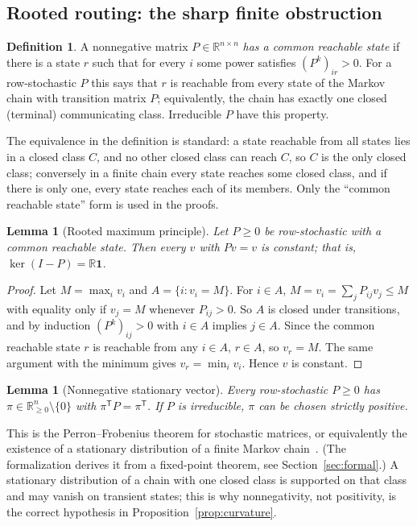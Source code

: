 \documentclass[11pt,reqno]{amsart}
\theoremstyle{plain}
\newtheorem{lemma}[theorem]{Lemma}
\theoremstyle{definition}
\newtheorem{definition}[theorem]{Definition}
\theoremstyle{remark}
\numberwithin{equation}{section}
\newcommand{\R}{\mathbb{R}}
\newcommand{\one}{\mathbf{1}}
\newcommand{\Ker}{\operatorname{ker}}
\newcommand{\T}{\mathsf{T}}
\begin{document}
\subsection{Rooted routing: the sharp finite obstruction}
\begin{definition}\label{def:rooted}
A nonnegative matrix $P\in\R^{n\times n}$ \emph{has a common reachable state} if there is a state $r$ such that for every $i$ some power satisfies $(P^k)_{ir}>0$.  For a row-stochastic $P$ this says that $r$ is reachable from every state of the Markov chain with transition matrix $P$; equivalently, the chain has exactly one closed (terminal) communicating class.  Irreducible $P$ have this property.
\end{definition}

The equivalence in the definition is standard: a state reachable from all states lies in a closed class $C$, and no other closed class can reach $C$, so $C$ is the only closed class; conversely in a finite chain every state reaches some closed class, and if there is only one, every state reaches each of its members.  Only the ``common reachable state'' form is used in the proofs.

\begin{lemma}[Rooted maximum principle]\label{lem:maxprinciple}
Let $P\ge0$ be row-stochastic with a common reachable state.  Then every $v$ with $Pv=v$ is constant; that is, $\Ker(I-P)=\R\one$.
\end{lemma}

\begin{proof}
Let $M=\max_iv_i$ and $A=\{i:v_i=M\}$.  For $i\in A$, $M=v_i=\sum_jP_{ij}v_j\le M$ with equality only if $v_j=M$ whenever $P_{ij}>0$.  So $A$ is closed under transitions, and by induction $(P^k)_{ij}>0$ with $i\in A$ implies $j\in A$.  Since the common reachable state $r$ is reachable from any $i\in A$, $r\in A$, so $v_r=M$.  The same argument with the minimum gives $v_r=\min_iv_i$.  Hence $v$ is constant.
\end{proof}

\begin{lemma}[Nonnegative stationary vector]\label{lem:stationary}
Every row-stochastic $P\ge0$ has $\pi\in\R^n_{\ge0}\setminus\{0\}$ with $\pi^{\T}P=\pi^{\T}$.  If $P$ is irreducible, $\pi$ can be chosen strictly positive.
\end{lemma}

This is the Perron--Frobenius theorem for stochastic matrices, or equivalently the existence of a stationary distribution of a finite Markov chain~\cite{Sen06,KS76,BP94}.  (The formalization derives it from a fixed-point theorem, see Section~\ref{sec:formal}.)  A stationary distribution of a chain with one closed class is supported on that class and may vanish on transient states; this is why nonnegativity, not positivity, is the correct hypothesis in Proposition~\ref{prop:curvature}.
\end{document}
